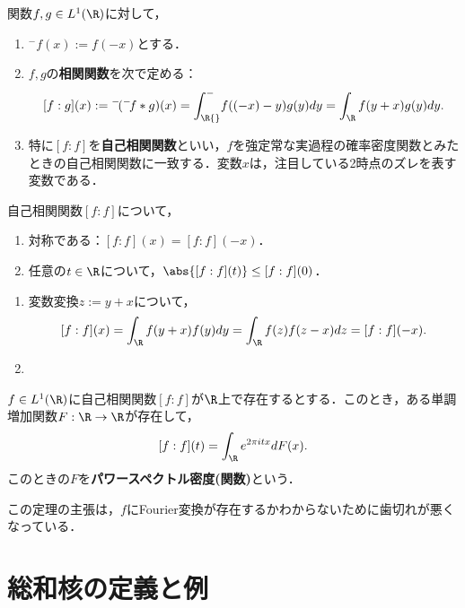 \documentclass[uplatex,dvipdfmx]{jsreport}
\begin{document}
\begin{notation}
    関数$f,g\in L^1(\R)$に対して，
    \begin{enumerate}
        \item ${}^-\!f(x):=f(-x)$とする．
        \item $f,g$の\textbf{相関関数}を次で定める：
        \[[f:g](x):={}^-\!({}^-\!f*g)(x)=\int_\R{}^-\!f((-x)-y)g(y)dy=\int_\R f(y+x)g(y)dy.\]
        \item 特に$[f:f]$を\textbf{自己相関関数}といい，$f$を強定常な実過程の確率密度関数とみたときの自己相関関数に一致する．変数$x$は，注目している2時点のズレを表す変数である．
    \end{enumerate}
\end{notation}

\begin{proposition}
    自己相関関数$[f:f]$について，
    \begin{enumerate}
        \item 対称である：$[f:f](x)=[f:f](-x)$．
        \item 任意の$t\in\R$について，$\abs{[f:f](t)}\le [f:f](0)$．
    \end{enumerate}
\end{proposition}
\begin{Proof}\mbox{}
    \begin{enumerate}
        \item 変数変換$z:=y+x$について，
        \[[f:f](x)=\int_\R f(y+x)f(y)dy=\int_\R f(z)f(z-x)dz=[f:f](-x).\]
        \item 
    \end{enumerate}
\end{Proof}

\begin{theorem}
    $f\in L^1(\R)$に自己相関関数$[f:f]$が$\R$上で存在するとする．このとき，ある単調増加関数$F:\R\to\R$が存在して，
    \[[f:f](t)=\int_\R e^{2\pi itx}dF(x).\]
    このときの$F$を\textbf{パワースペクトル密度(関数)}という．
\end{theorem}
\begin{remarks}
    この定理の主張は，$f$にFourier変換が存在するかわからないために歯切れが悪くなっている．

\end{remarks}

\section{総和核の定義と例}
\end{document}
